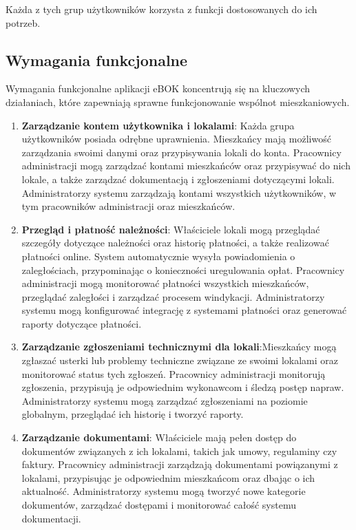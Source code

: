 Każda z tych grup użytkowników korzysta z funkcji dostosowanych do ich potrzeb.

\subsection{Wymagania funkcjonalne}

Wymagania funkcjonalne aplikacji eBOK koncentrują się na kluczowych działaniach, które zapewniają sprawne funkcjonowanie wspólnot mieszkaniowych.

\begin{enumerate}[label=\arabic*.]

    \item \textbf{Zarządzanie kontem użytkownika i lokalami}: Każda grupa użytkowników posiada odrębne uprawnienia. Mieszkańcy mają możliwość zarządzania swoimi danymi oraz przypisywania lokali do konta. Pracownicy administracji mogą zarządzać kontami mieszkańców oraz przypisywać do nich lokale, a także zarządzać dokumentacją i zgłoszeniami dotyczącymi lokali. Administratorzy systemu zarządzają kontami wszystkich użytkowników, w tym pracowników administracji oraz mieszkańców.

	\item \textbf{Przegląd i płatność należności}: Właściciele lokali mogą przeglądać szczegóły dotyczące należności oraz historię płatności, a także realizować płatności online. System automatycznie wysyła powiadomienia o zaległościach, przypominając o konieczności uregulowania opłat. Pracownicy administracji mogą monitorować płatności wszystkich mieszkańców, przeglądać zaległości i zarządzać procesem windykacji. Administratorzy systemu mogą konfigurować integrację z systemami płatności oraz generować raporty dotyczące płatności.

	\item \textbf{Zarządzanie zgłoszeniami technicznymi dla lokali}:Mieszkańcy mogą zgłaszać usterki lub problemy techniczne związane ze swoimi lokalami oraz monitorować status tych zgłoszeń. Pracownicy administracji monitorują zgłoszenia, przypisują je odpowiednim wykonawcom i śledzą postęp napraw. Administratorzy systemu mogą zarządzać zgłoszeniami na poziomie globalnym, przeglądać ich historię i tworzyć raporty.

	\item \textbf{Zarządzanie dokumentami}: Właściciele mają pełen dostęp do dokumentów związanych z ich lokalami, takich jak umowy, regulaminy czy faktury. Pracownicy administracji zarządzają dokumentami powiązanymi z lokalami, przypisując je odpowiednim mieszkańcom oraz dbając o ich aktualność. Administratorzy systemu mogą tworzyć nowe kategorie dokumentów, zarządzać dostępami i monitorować całość systemu dokumentacji.


\end{enumerate}
